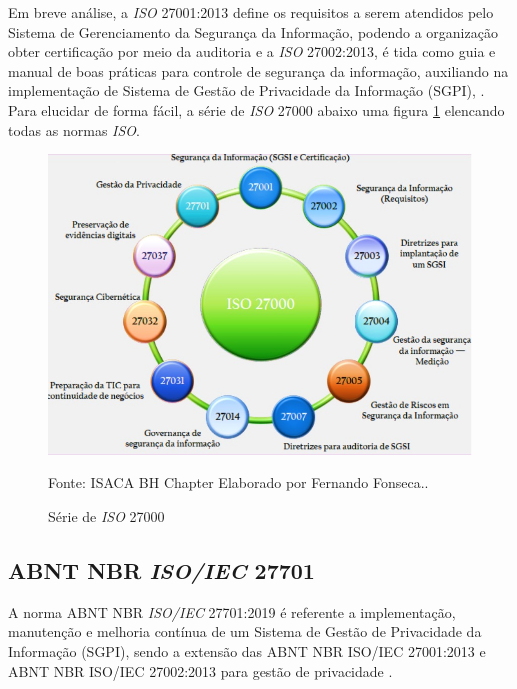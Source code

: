 \documentclass[
	12pt,				%
	openright,			%
	oneside,			%
	a4paper,			%
	english,			%
	french,				%
	spanish,			%
	brazil,				%
	]{abntex2}
\begin{document}
Em breve análise, a \textit{ISO} 27001:2013 define os requisitos a serem atendidos pelo Sistema de Gerenciamento da Segurança da Informação, podendo a organização obter certificação por meio da auditoria e a \textit{ISO} 27002:2013, é tida como guia e manual de boas práticas para controle de segurança da informação, auxiliando na implementação de Sistema de Gestão de Privacidade da Informação (SGPI), \cite{Jimene2020}. Para elucidar de forma fácil, a série de \textit{ISO} 27000 abaixo uma figura \ref{fig: Iso } elencando todas as normas \textit{ISO}.

\begin{figure}[ht]
    \centering
    \caption{Série de \textit{ISO} 27000}
    \includegraphics[width=6.0in]{Images/03ISO.jpeg}
    
    \label{fig: Iso }
    \centering \small Fonte: ISACA BH Chapter Elaborado por Fernando Fonseca..
\end{figure}

\subsection{ABNT NBR \textit{ISO/IEC} 27701 }

A norma ABNT NBR \textit{ISO/IEC} 27701:2019 é referente a implementação, manutenção e melhoria contínua de um Sistema de Gestão de Privacidade da Informação (SGPI), sendo a extensão das ABNT NBR ISO/IEC 27001:2013 e ABNT NBR ISO/IEC 27002:2013 para gestão de privacidade \cite{abnt}.
\end{document}

